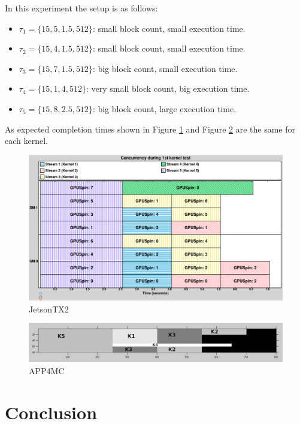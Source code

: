 \documentclass[
  12pt,
  a4paperpaper,
]{report}
\providecommand{\tightlist}{%
  \setlength{\itemsep}{0pt}\setlength{\parskip}{0pt}}
\begin{document}
In this experiment the setup is as follows:

\begin{itemize}
\tightlist
\item
  \(\tau_1 = \{15,5,1.5,512\}\): small block count, small execution
  time.
\item
  \(\tau_2 = \{15,4,1.5,512\}\): small block count, small execution
  time.
\item
  \(\tau_3 = \{15,7,1.5,512\}\): big block count, small execution time.
\item
  \(\tau_4 =\{ 15, 1,4,512\}\): very small block count, big execution
  time.
\item
  \(\tau_5 = \{15,8,2.5,512\}\): big block count, large execution time.
\end{itemize}

As expected completion times shown in Figure \ref{img:nvidia-ex07} and
Figure \ref{img:octave-ex07} are the same for each kernel.

\begin{figure}
\centering
\includegraphics[width=1\textwidth,height=\textheight]{source/figures/nvidia/ex07.png}
\caption{JetsonTX2 \label{img:nvidia-ex07}}
\end{figure}

\begin{figure}
\centering
\includegraphics[width=1\textwidth,height=\textheight]{source/figures/octave/ex07.png}
\caption{APP4MC \label{img:octave-ex07}}
\end{figure}

\hypertarget{conclusion}{%
\chapter{Conclusion}\label{conclusion}}
\end{document}
